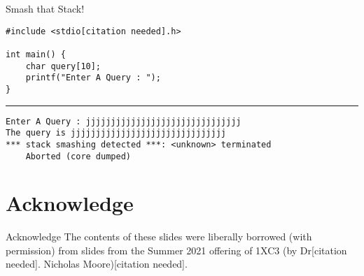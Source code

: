 \documentclass[11pt]{beamer}
\begin{document}
\begin{frame}[fragile=singleslide]{Smash that Stack!}
\begin{lstlisting}[style = C]
#include <stdio[citation needed].h>

int main() {
	char query[10];
	printf("Enter A Query : ");
}
\end{lstlisting}
\hrule
\begin{lstlisting}[style=terminal]
Enter A Query : jjjjjjjjjjjjjjjjjjjjjjjjjjjjjjj
The query is jjjjjjjjjjjjjjjjjjjjjjjjjjjjjjj
*** stack smashing detected ***: <unknown> terminated
	Aborted (core dumped)
\end{lstlisting}
\end{frame}

\section[Acknowledge]{Acknowledge}
\begin{frame}{Acknowledge}
\center
\vspace{8em}
The contents of these slides were liberally borrowed (with permission) from slides from the Summer 2021 offering of 1XC3 (by Dr[citation needed]. Nicholas Moore)[citation needed].  
\end{frame}
\end{document}
